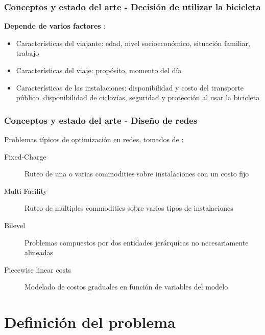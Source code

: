 \documentclass[aspectratio=43, 10pt]{beamer}
\begin{document}

\begin{frame}
    \frametitle{Conceptos y estado del arte - Decisión de utilizar la bicicleta}

    \textbf{Depende de varios factores} \parencite{ortuz2011}:

    \begin{itemize}
        \item{Características del viajante: edad, nivel socioeconómico, situación familiar, trabajo}
        \item{Características del viaje: propósito, momento del día}
        \item{Características de las instalaciones: disponibilidad y costo del transporte público, disponibilidad de ciclovías, seguridad y protección al usar la bicicleta}
    \end{itemize}
\end{frame}

\begin{frame}
    \frametitle{Conceptos y estado del arte - Diseño de redes}

    Problemas típicos de optimización en redes, tomados de \parencite{crainic2021}:

    \begin{description}
        \item[Fixed-Charge] Ruteo de una o varias commodities sobre instalaciones con un costo fijo
        \item[Multi-Facility] Ruteo de múltiples commodities sobre varios tipos de instalaciones
        \item[Bilevel] Problemas compuestos por dos entidades jerárquicas no necesariamente alineadas
        \item[Piecewise linear costs] Modelado de costos graduales en función de variables del modelo
    \end{description}
\end{frame}

\section{Definición del problema}
\end{document}

